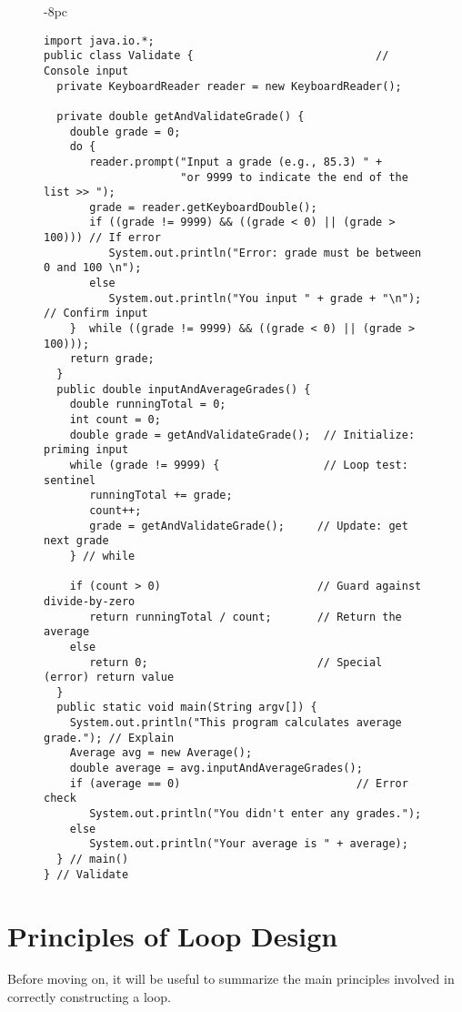 \begin{figure}[p]
\jjjprogstart
\begin{jjjlistingleft}[34pc]{-8pc}
\begin{lstlisting}
import java.io.*;
public class Validate {                            // Console input
  private KeyboardReader reader = new KeyboardReader();  

  private double getAndValidateGrade() {
    double grade = 0;
    do {
       reader.prompt("Input a grade (e.g., 85.3) " +
                     "or 9999 to indicate the end of the list >> ");
       grade = reader.getKeyboardDouble();
       if ((grade != 9999) && ((grade < 0) || (grade > 100))) // If error
          System.out.println("Error: grade must be between 0 and 100 \n");  
       else
          System.out.println("You input " + grade + "\n");  // Confirm input
    }  while ((grade != 9999) && ((grade < 0) || (grade > 100)));
    return grade;
  }
  public double inputAndAverageGrades() {
    double runningTotal = 0;
    int count = 0;
    double grade = getAndValidateGrade();  // Initialize: priming input
    while (grade != 9999) {                // Loop test: sentinel
       runningTotal += grade;                            
       count++;                                          
       grade = getAndValidateGrade();     // Update: get next grade
    } // while

    if (count > 0)                        // Guard against divide-by-zero
       return runningTotal / count;       // Return the average
    else
       return 0;                          // Special (error) return value
  }
  public static void main(String argv[]) {
    System.out.println("This program calculates average grade."); // Explain
    Average avg = new Average();
    double average = avg.inputAndAverageGrades();
    if (average == 0)                           // Error check
       System.out.println("You didn't enter any grades.");
    else
       System.out.println("Your average is " + average);        
  } // main()
} // Validate
\end{lstlisting}
\end{jjjlistingleft}
\end{figure}

\section{Principles of Loop Design}
\noindent Before moving on, it will be useful to summarize the main
principles involved in correctly
constructing a loop.

